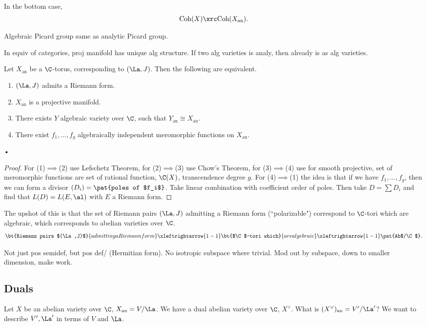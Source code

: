 In the bottom case, 
\[
\text{Coh}(X)\xrc \text{Coh}(X_{\text{an}}).
\]

Algebraic Picard group same as analytic Picard group.

In equiv of categories, proj manifold has unique alg structure. If two alg varieties is analy, then already is as alg varieties. 

\begin{thm}
Let $X_{\text{an}}$ be a $\C$-torus, corresponding to $(\La, J)$. Then the following are equivalent.
\begin{enumerate}
\item
$(\La,J)$ admits a Riemann form.
\item
$X_{\text{an}}$ is a projective manifold.
\item
There exists $Y$ algebraic variety over $\C$, such that $Y_{\text{an}}\cong X_{\text{an}}$. 
\item
There exist $f_1,\ldots, f_g$ algebraically independent meromorphic functions on $X_{\text{an}}$. 
\end{enumerate}•
\end{thm}
\begin{proof}
For (1)$\implies$(2) use Lefschetz Theorem, for (2)$\implies$(3) use Chow's Theorem, for (3)$\implies$(4) use for smooth projective, set of meromorphic functions are set of rational function, $\C(X)$, transcendence degree $g$. 
For (4)$\implies$(1) the idea is that if we have $f_1,\ldots, f_g$, then we can form a divisor $(D_i)=\pat{poles of $f_i$}$. Take linear combination with coefficient order of poles. Then take $D=\sum D_i$ and find that $L(D)=L(E,\al)$ with $E$ a Riemann form.
\end{proof}
The upshot of this is that the set of Riemann pairs $(\La,J)$ admitting a Riemann form (``polarizable") correspond to $\C$-tori which are algebraic, which corresponds to abelian varieties over $\C$.
\[
\bt{Riemann pairs $(\La,J)$}{admitting a Riemann form} \xleftrightarrow{1-1}
\bt{$\C$-tori which}{are algebraic} %
\xleftrightarrow{1-1} 
\pat{Ab$/\C$}.
\]

Not just pos semidef, but pos def/
(Hermitian form). No isotropic subspace where trivial. Mod out by subspace, down to smaller dimension, make work.
\subsection{Duals}
Let $X$ be an abelian variety over $\C$, $X_{\text{an}}=V/\La$. We have a dual abelian variety over $\C$, $X^{\vee}$. What is 
$(X^{\vee})_{\text{an}}=V'/\La'$? We want to describe $V',\La'$ in terms of $V$ and $\La$.

